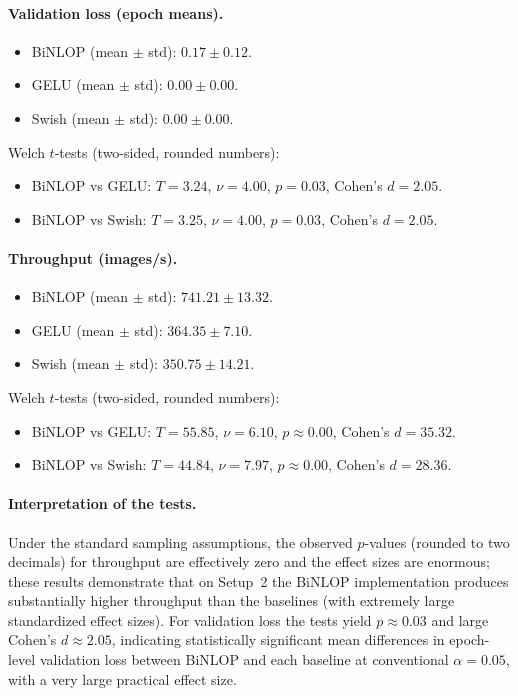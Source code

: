 \documentclass[11pt, twoside, openright, english]{article}
\numberwithin{equation}{section}
\theoremstyle{plain}
\theoremstyle{definition}
\theoremstyle{remark}
\begin{document}
\paragraph{Validation loss (epoch means).}
\begin{itemize}
  \item BiNLOP (mean $\pm$ std): $0.17 \pm 0.12$.
  \item GELU (mean $\pm$ std): $0.00 \pm 0.00$.
  \item Swish (mean $\pm$ std): $0.00 \pm 0.00$.
\end{itemize}

Welch $t$-tests (two-sided, rounded numbers):
\begin{itemize}
  \item BiNLOP vs GELU: $T = 3.24$, $\nu = 4.00$, $p = 0.03$, Cohen's $d = 2.05$.
  \item BiNLOP vs Swish: $T = 3.25$, $\nu = 4.00$, $p = 0.03$, Cohen's $d = 2.05$.
\end{itemize}

\paragraph{Throughput (images/s).}
\begin{itemize}
  \item BiNLOP (mean $\pm$ std): $741.21 \pm 13.32$.
  \item GELU (mean $\pm$ std): $364.35 \pm 7.10$.
  \item Swish (mean $\pm$ std): $350.75 \pm 14.21$.
\end{itemize}

Welch $t$-tests (two-sided, rounded numbers):
\begin{itemize}
  \item BiNLOP vs GELU: $T = 55.85$, $\nu = 6.10$, $p \approx 0.00$, Cohen's $d = 35.32$.
  \item BiNLOP vs Swish: $T = 44.84$, $\nu = 7.97$, $p \approx 0.00$, Cohen's $d = 28.36$.
\end{itemize}

\paragraph{Interpretation of the tests.}
Under the standard sampling assumptions, the observed $p$-values (rounded to two decimals) for throughput are effectively zero and the effect sizes are enormous; these results demonstrate that on Setup~2 the BiNLOP implementation produces substantially higher throughput than the baselines (with extremely large standardized effect sizes). For validation loss the tests yield $p\approx 0.03$ and large Cohen's $d\approx 2.05$, indicating statistically significant mean differences in epoch-level validation loss between BiNLOP and each baseline at conventional $\alpha=0.05$, with a very large practical effect size.
\end{document}
